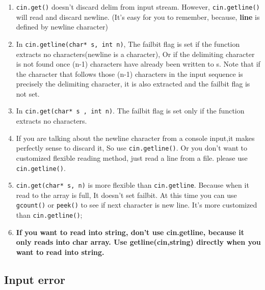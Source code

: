\documentclass[a4paper,11pt,twoside]{book}
\begin{document}
\begin{itemize}
\begin{enumerate}
		\item \texttt{cin.get()} doesn't discard delim from input stream. However, \texttt{cin.getline()} will read and discard newline.  (It's easy for you to remember, because, \textbf{line} is defined by newline character)
		
		\item In \texttt{cin.getline(char* s, int n)}, The failbit flag is set if the function extracts no characters(newline is a character), Or if the delimiting character is not found once (n-1) characters have already been written to s. Note that if the character that follows those (n-1) characters in the input sequence is precisely the delimiting character, it is also extracted and the failbit flag is not set.
		
		\item In \texttt{cin.get(char* s ,  int n)}. The failbit flag is set only if the function extracts no characters.
		
		\item If you are talking about the newline character from a console input,it makes perfectly sense to discard it, So use \texttt{cin.getline()}. Or you don't want to customized flexible reading method, just read a line from a file. please use \texttt{cin.getline()}.
		
		\item \texttt{cin.get(char* s, n)} is more flexible than \texttt{cin.getline}. Because when it read to the array is full, It doesn't set failbit. At this time you can use \texttt{gcount()} or \texttt{peek()} to see if next character is new line. It's more customized than  \texttt{cin.getline()};

        \item \textbf{If you want to read into string, don't use cin.getline, because it only reads into char array. Use getline(cin,string) directly when you want to read into string.}
	\end{enumerate}
	
\end{itemize}

\subsection{Input error}
\end{document}
